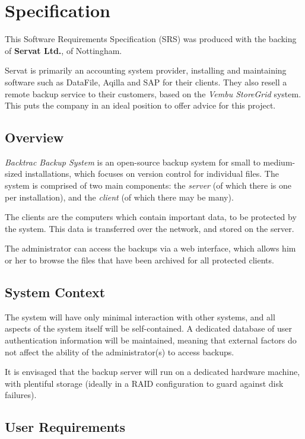 \chapter{Specification}

This Software Requirements Specification (SRS) was produced with the backing of
\textbf{Servat Ltd.}, of Nottingham.

Servat is primarily an accounting system provider, installing and maintaining
software such as DataFile, Aqilla and SAP for their clients. They also resell
a remote backup service to their customers, based on the \emph{Vembu StoreGrid}
system. This puts the company in an ideal position to offer advice for this
project.

\section{Overview}

\emph{Backtrac Backup System} is an open-source backup system for small to
medium-sized installations, which focuses on version control for individual
files. The system is comprised of two main components: the \emph{server} (of
which there is one per installation), and the \emph{client} (of which there
may be many).

The clients are the computers which contain important data, to be
protected by the system. This data is transferred over the network, and stored
on the server.

The administrator can access the backups via a web interface, which allows
him or her to browse the files that have been archived for all protected
clients.

\section{System Context}

The system will have only minimal interaction with other systems, and all
aspects of the system itself will be self-contained. A dedicated database of
user authentication information will be maintained, meaning that external
factors do not affect the ability of the administrator(s) to access backups.

It is envisaged that the backup server will run on a dedicated hardware
machine, with plentiful storage (ideally in a RAID configuration to guard
against disk failures).

\section{User Requirements}


